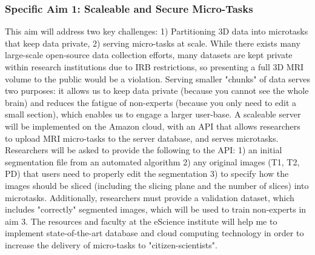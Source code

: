 \subsubsection*{Specific Aim 1: Scaleable and Secure Micro-Tasks}

This aim will address two key challenges: 1) Partitioning 3D data into microtasks that keep data private, 2) serving micro-tasks at scale. While there exists many large-scale open-source data collection efforts, many datasets are kept private within research institutions due to  IRB restrictions, so presenting a full 3D MRI volume to the public would be a violation. Serving smaller "chunks" of data serves two purposes: it allows us to keep data private (because you cannot see the whole brain) and reduces the fatigue of non-experts (because you only need to edit a small section), which enables us to engage a larger user-base. A scaleable server will be implemented on the Amazon cloud, with an API that allows researchers to upload MRI micro-tasks to the server database, and serves microtasks. Researchers will be asked to provide the following to the API: 1) an initial segmentation file from an automated algorithm 2) any original images (T1, T2, PD) that  users need to properly edit the segmentation 3) to specify how the images should be sliced (including the slicing plane and the number of slices) into microtasks. Additionally, researchers must provide a validation dataset, which includes "correctly" segmented images, which will be used to train non-experts in aim 3. The resources and faculty at the eScience institute will help me to implement state-of-the-art database and cloud computing technology in order to increase the delivery of micro-tasks to "citizen-scientists".
